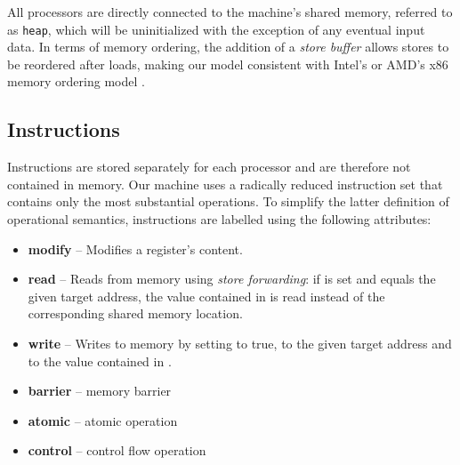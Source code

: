 All processors are directly connected to the machine's shared memory, referred to as \texttt{heap}, which will be uninitialized with the exception of any eventual input data.
In terms of memory ordering, the addition of a \emph{store buffer} allows stores to be reordered after loads, making our model consistent with Intel's or AMD's x86 memory ordering model \cite{intel, amd}.

\subsection{Instructions}


Instructions are stored separately for each processor and are therefore not contained in memory.
Our machine uses a radically reduced instruction set that contains only the most substantial operations.
To simplify the latter definition of operational semantics, instructions are labelled using the following attributes:



\begin{itemize}
  \item \textbf{modify} -- Modifies a register's content.
  \item \textbf{read} -- Reads from memory using \emph{store forwarding}: if \sbfull{} is set and \sbadr{} equals the given target address, the value contained in \sbval{} is read instead of the corresponding shared memory location.
  \item \textbf{write} -- Writes to memory by setting \sbfull{} to true, \sbadr{} to the given target address and \sbval{} to the value contained in \accu{}.
  \item \textbf{barrier} -- memory barrier%
  \item \textbf{atomic} -- atomic operation%
  \item \textbf{control} -- control flow operation
\end{itemize}

